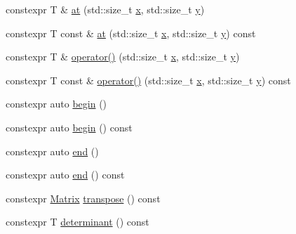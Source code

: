 \begin{DoxyCompactItemize}
\item 
constexpr T \& \mbox{\hyperlink{class_saturn_1_1_math_1_1_matrix_3_01_t_00_013_00_013_01_4_a953bb9dda39f489340751274aed5ca34}{at}} (std\+::size\+\_\+t \mbox{\hyperlink{glad_8h_a3dddca64560508b8d5bd9ee938e2d3a3}{x}}, std\+::size\+\_\+t \mbox{\hyperlink{glad_8h_a12b33d8afd2f771e63a85ea45a440c64}{y}})
\item 
constexpr T const  \& \mbox{\hyperlink{class_saturn_1_1_math_1_1_matrix_3_01_t_00_013_00_013_01_4_aafa4cc31f61f9086334b0683a1d87254}{at}} (std\+::size\+\_\+t \mbox{\hyperlink{glad_8h_a3dddca64560508b8d5bd9ee938e2d3a3}{x}}, std\+::size\+\_\+t \mbox{\hyperlink{glad_8h_a12b33d8afd2f771e63a85ea45a440c64}{y}}) const
\item 
constexpr T \& \mbox{\hyperlink{class_saturn_1_1_math_1_1_matrix_3_01_t_00_013_00_013_01_4_a1cf5defc5bff8b8a76e10e75a0d403e3}{operator()}} (std\+::size\+\_\+t \mbox{\hyperlink{glad_8h_a3dddca64560508b8d5bd9ee938e2d3a3}{x}}, std\+::size\+\_\+t \mbox{\hyperlink{glad_8h_a12b33d8afd2f771e63a85ea45a440c64}{y}})
\item 
constexpr T const  \& \mbox{\hyperlink{class_saturn_1_1_math_1_1_matrix_3_01_t_00_013_00_013_01_4_a50353cc2092b03b9bf02efd6db814a9f}{operator()}} (std\+::size\+\_\+t \mbox{\hyperlink{glad_8h_a3dddca64560508b8d5bd9ee938e2d3a3}{x}}, std\+::size\+\_\+t \mbox{\hyperlink{glad_8h_a12b33d8afd2f771e63a85ea45a440c64}{y}}) const
\item 
constexpr auto \mbox{\hyperlink{class_saturn_1_1_math_1_1_matrix_3_01_t_00_013_00_013_01_4_a684ea34f60638b1ec34d4dd3a37dc221}{begin}} ()
\item 
constexpr auto \mbox{\hyperlink{class_saturn_1_1_math_1_1_matrix_3_01_t_00_013_00_013_01_4_a313986a6c516f12bfdac32fd321d5475}{begin}} () const
\item 
constexpr auto \mbox{\hyperlink{class_saturn_1_1_math_1_1_matrix_3_01_t_00_013_00_013_01_4_a29b905706e2c85a2f70d3a615f9c7f4f}{end}} ()
\item 
constexpr auto \mbox{\hyperlink{class_saturn_1_1_math_1_1_matrix_3_01_t_00_013_00_013_01_4_abc909039267b9e7376f28ac2684f5c8d}{end}} () const
\item 
constexpr \mbox{\hyperlink{class_saturn_1_1_math_1_1_matrix}{Matrix}} \mbox{\hyperlink{class_saturn_1_1_math_1_1_matrix_3_01_t_00_013_00_013_01_4_a54ffe93160c1ffe2e8cc4434b6dc2382}{transpose}} () const
\item 
constexpr T \mbox{\hyperlink{class_saturn_1_1_math_1_1_matrix_3_01_t_00_013_00_013_01_4_a5b0f3626a683a95276645988b525d4d8}{determinant}} () const
\end{DoxyCompactItemize}
